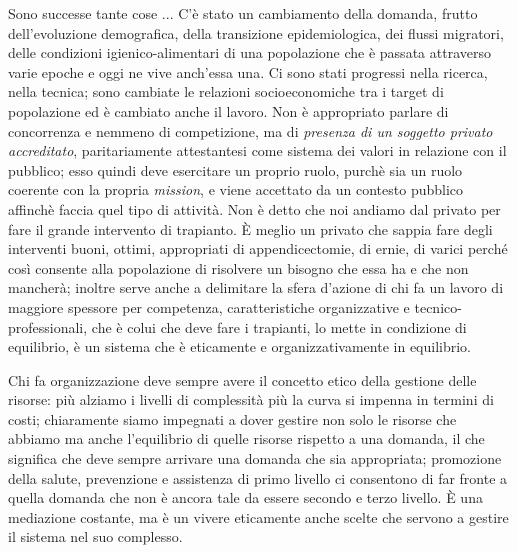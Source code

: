 Sono successe tante cose ... C'è stato un cambiamento della domanda,
frutto dell'evoluzione demografica, della transizione epidemiologica,
dei flussi migratori, delle condizioni igienico-alimentari di una
popolazione che è passata attraverso varie epoche e oggi ne vive
anch'essa una. Ci sono stati progressi nella ricerca, nella tecnica;
sono cambiate le relazioni socioeconomiche tra i target di popolazione
ed è cambiato anche il lavoro. Non è appropriato parlare di concorrenza
e nemmeno di competizione, ma di \emph{presenza di un soggetto privato
accreditato}, paritariamente attestantesi come sistema dei valori in
relazione con il pubblico; esso quindi deve esercitare un proprio ruolo,
purchè sia un ruolo coerente con la propria \emph{mission}, e viene
accettato da un contesto pubblico affinchè faccia quel tipo di attività.
Non è detto che noi andiamo dal privato per fare il grande intervento di
trapianto. È meglio un privato che sappia fare degli interventi buoni,
ottimi, appropriati di appendicectomie, di ernie, di varici perché così
consente alla popolazione di risolvere un bisogno che essa ha e che non
mancherà; inoltre serve anche a delimitare la sfera d'azione di chi fa
un lavoro di maggiore spessore per competenza, caratteristiche
organizzative e tecnico-professionali, che è colui che deve fare i
trapianti, lo mette in condizione di equilibrio, è un sistema che è
eticamente e organizzativamente in equilibrio.

Chi fa organizzazione deve sempre avere il concetto etico della gestione
delle risorse: più alziamo i livelli di complessità più la curva si
impenna in termini di costi; chiaramente siamo impegnati a dover gestire
non solo le risorse che abbiamo ma anche l'equilibrio di quelle risorse
rispetto a una domanda, il che significa che deve sempre arrivare una
domanda che sia appropriata; promozione della salute, prevenzione e
assistenza di primo livello ci consentono di far fronte a quella domanda
che non è ancora tale da essere secondo e terzo livello. È una
mediazione costante, ma è un vivere eticamente anche scelte che servono
a gestire il sistema nel suo complesso.

